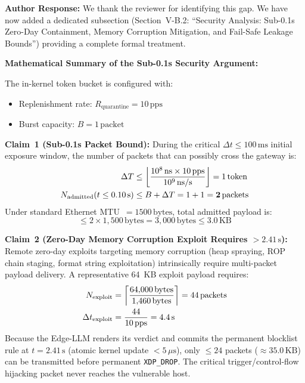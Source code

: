 \documentclass[10pt,letterpaper]{article}
\begin{document}
\begin{authorbox}
\textbf{Author Response:}
We thank the reviewer for identifying this gap. We have now added a dedicated
subsection (Section~V-B.2: ``Security Analysis: Sub-0.1s Zero-Day
Containment, Memory Corruption Mitigation, and Fail-Safe Leakage Bounds'')
providing a complete formal treatment.

\textbf{Mathematical Summary of the Sub-0.1s Security Argument:}

The in-kernel token bucket is configured with:
\begin{itemize}
  \item Replenishment rate: $R_{\mathrm{quarantine}} = 10\,\mathrm{pps}$
  \item Burst capacity: $B = 1\,\mathrm{packet}$
\end{itemize}

\textbf{Claim~1 (Sub-0.1s Packet Bound):}
During the critical $\Delta t \le 100\,\mathrm{ms}$ initial exposure window,
the number of packets that can possibly cross the gateway is:
\begin{align}
  \Delta T &\le \left\lfloor \frac{10^8\,\mathrm{ns} \times 10\,\mathrm{pps}}{10^9\,\mathrm{ns/s}} \right\rfloor = 1\,\mathrm{token} \notag \\
  N_{\mathrm{admitted}}(t \le 0.10\,\mathrm{s}) &\le B + \Delta T = 1 + 1 = \mathbf{2\,\mathrm{packets}}
\end{align}
Under standard Ethernet MTU~$=1500\,\mathrm{bytes}$, total admitted payload is:
\[
  \le 2 \times 1{,}500\,\mathrm{bytes} = 3{,}000\,\mathrm{bytes} \le 3.0\,\mathrm{KB}
\]

\textbf{Claim~2 (Zero-Day Memory Corruption Exploit Requires $>2.41\,\mathrm{s}$):}
Remote zero-day exploits targeting memory corruption (heap spraying, ROP chain
staging, format string exploitation) intrinsically require multi-packet payload
delivery. A representative 64~KB exploit payload requires:
\begin{align}
  N_{\mathrm{exploit}} &= \left\lceil \frac{64{,}000\,\mathrm{bytes}}{1{,}460\,\mathrm{bytes}}\right\rceil = 44\,\mathrm{packets} \notag \\
  \Delta t_{\mathrm{exploit}} &= \frac{44}{10\,\mathrm{pps}} = 4.4\,\mathrm{s}
\end{align}
Because the Edge-LLM renders its verdict and commits the permanent blocklist
rule at $t = 2.41\,\mathrm{s}$ (atomic kernel update $< 5\,\mu\mathrm{s}$),
only $\le 24$ packets ($\approx 35.0\,\mathrm{KB}$) can be transmitted before
permanent \texttt{XDP\_DROP}. The critical trigger/control-flow hijacking
packet never reaches the vulnerable host.


\end{authorbox}
\end{document}
